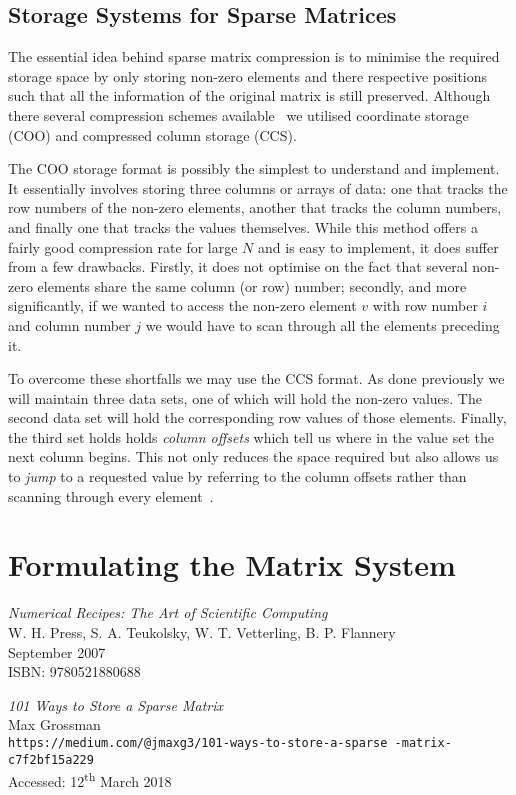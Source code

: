 \documentclass[a4paper]{article}
\begin{document}
\subsection{Storage Systems for Sparse Matrices}
The essential idea behind sparse matrix compression is to minimise the required
storage space by only storing non-zero elements and there respective positions
such that all the information of the original matrix is still preserved.
Although there several compression schemes available~\cite{101matstore} we
utilised coordinate storage (COO) and compressed column storage (CCS).

The COO storage format is possibly the simplest to understand and implement. It
essentially involves storing three columns or arrays of data: one that tracks
the row numbers of the non-zero elements, another that tracks the column
numbers, and finally one that tracks the values themselves. While this method
offers a fairly good compression rate for large $N$ and is easy to implement,
it does suffer from a few drawbacks. Firstly, it does not optimise on the fact
that several non-zero elements share the same column (or row) number; secondly,
and more significantly, if we wanted to access the non-zero element $v$ with
row number $i$ and column number $j$ we would have to scan through all the
elements preceding it.

To overcome these shortfalls we may use the CCS format. As done previously we
will maintain three data sets, one of which will hold the non-zero values. The
second data set will hold the corresponding row values of those elements.
Finally, the third set holds holds \emph{column offsets} which tell us where in
the value set the next column begins. This not only reduces the space required
but also allows us to \emph{jump} to a requested value by referring to the
column offsets rather than scanning through every element~\cite{101matstore}.

\section{Formulating the Matrix System}






\begin{thebibliography}{9}

		\emph{Numerical Recipes: The Art of Scientific Computing}\\
		W. H. Press, S. A. Teukolsky, W. T. Vetterling, B. P. Flannery\\
		September 2007\\
		ISBN: 9780521880688

		\emph{101 Ways to Store a Sparse Matrix}\\
		Max Grossman\\
		\texttt{https://medium.com/@jmaxg3/101-ways-to-store-a-sparse
		-matrix-c7f2bf15a229}\\
		Accessed: 12\textsuperscript{th} March 2018

\end{thebibliography}
\end{document}
